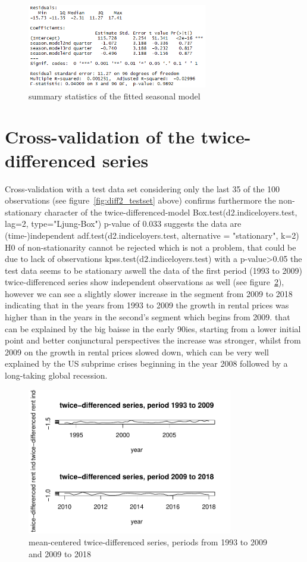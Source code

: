 \documentclass[11pt,a4paper]{article}
\begin{document}
\begin{figure}[!ht]
\centering
\includegraphics[angle=0,
width=0.7\textwidth]{summary_seasonmodel}
\caption{summary statistics of the fitted seasonal model\label{fig:summary_seasonmodel}}
\end{figure}

\section{Cross-validation of the twice-differenced series}
Cross-validation with a test data set considering only the last 35 of the 100 observations (see figure~\ref{fig:diff2_testset} above) confirms furthermore the non-stationary character of the twice-differenced-model 
Box.test(d2.indiceloyers.test, lag=2, type="Ljung-Box") p-value of 0.033 suggests the data are (time-)independent
adf.test(d2.indiceloyers.test, alternative = "stationary", k=2)  H0 of non-stationarity cannot be rejected which is not a problem, that could be due to lack of observations
kpss.test(d2.indiceloyers.test)  with a p-value>0.05 the test data seems to be stationary aswell
the data of the first period (1993 to 2009) twice-differenced series show independent observations as well (see figure~\ref{fig:diff2_test_train}), however we can see a slightly slower increase in the segment from 2009 to 2018 indicating that in the years from 1993 to 2009 the growth in rental prices was higher than in the years in the second's segment which begins from 2009. that can be explained by the big baisse in the early 90ies, starting from a lower initial point and better conjunctural perspectives the increase was stronger, whilst from 2009 on the growth in rental prices slowed down, which can be very well explained by the US subprime crises beginning in the year 2008 followed by a long-taking global recession.
\begin{figure}[!htb]
\centering
\includegraphics[angle=0,
width=0.8\textwidth]{diff2_test_train}
\caption{mean-centered twice-differenced series, periods from 1993 to 2009 and 2009 to 2018
\label{fig:diff2_test_train}}
\end{figure}
\end{document}
